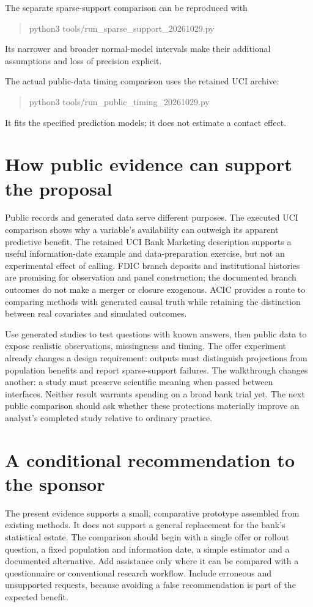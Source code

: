 The separate sparse-support comparison can be reproduced with
\begin{quote}\small\ttfamily
python3 tools/run\_sparse\_support\_20261029.py
\end{quote}
Its narrower and broader normal-model intervals make their additional
assumptions and loss of precision explicit.

The actual public-data timing comparison uses the retained UCI archive:
\begin{quote}\small\ttfamily
python3 tools/run\_public\_timing\_20261029.py
\end{quote}
It fits the specified prediction models; it does not estimate a contact effect.

\section{How public evidence can support the proposal}
Public records and generated data serve different purposes. The executed UCI
comparison shows why a variable's availability can outweigh its apparent
predictive benefit. The retained UCI
Bank Marketing description supports a useful information-date example and
data-preparation exercise, but not an experimental effect of calling. FDIC
branch deposits and institutional histories are promising for observation and
panel construction; the documented branch outcomes do not make a merger or
closure exogenous. ACIC provides a route to comparing methods with generated
causal truth while retaining the distinction between real covariates and
simulated outcomes.
\citep{pd15_uci_bank,pd15_fdic_sod,pd15_fdic_api_spec,pd15_acic_pinned}

Use generated studies to test questions with known answers, then public data
to expose realistic observations, missingness and timing. The offer experiment
already changes a design requirement: outputs must distinguish projections
from population benefits and report sparse-support failures. The walkthrough
changes another: a study must preserve scientific meaning when passed between
interfaces. Neither result warrants spending on a broad bank trial yet. The
next public comparison should ask whether these protections materially improve
an analyst's completed study relative to ordinary practice.

\section{A conditional recommendation to the sponsor}
The present evidence supports a small, comparative prototype assembled from
existing methods. It does not support a general replacement for the bank's
statistical estate. The comparison should begin with a single offer or rollout
question, a fixed population and information date, a simple estimator and a
documented alternative. Add assistance only where it can be compared with a
questionnaire or conventional research workflow. Include erroneous and
unsupported requests, because avoiding a false recommendation is part of
the expected benefit.

